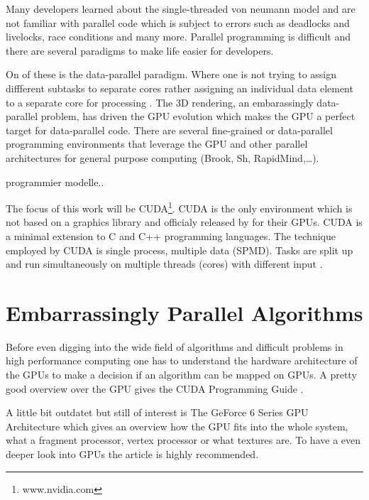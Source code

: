 Many developers learned about the single-threaded von neumann model and are not
familiar with parallel code which is subject to errors such as deadlocks and
livelocks, race conditions and many more. Parallel programming is difficult and
there are several paradigms to make life easier for developers.

On of these is the data-parallel paradigm. Where one is not trying to assign
diffferent subtasks to separate cores rather assigning an individual data
element to a separate core for processing \citep{citeulike:3750565}. The
\gls{3D} rendering, an embarassingly data-parallel problem, has driven the
\gls{GPU} evolution which makes the \gls{GPU} a perfect target for data-parallel
code. There are several fine-grained or data-parallel programming environments
that leverage the \gls{GPU} and other parallel architectures for general purpose
computing (Brook, Sh, RapidMind,\ldots).

{\color{red} programmier modelle..}

The focus of this work will be CUDA\footnote{www.nvidia.com}. \gls{CUDA} is the
only environment which is not based on a graphics library and officialy released
by {} for their \glspl{GPU}. \Gls{CUDA} is a minimal
extension to C and C++ programming languages. The technique employed by
\gls{CUDA} is single process, multiple data (SPMD). Tasks are split up and run
simultaneously on multiple threads (cores) with different input
\citep{citeulike:3072519}.

\section{Embarrassingly Parallel Algorithms} %
\label{ssub:choosing_a_fast_algorithm}
Before even digging into the wide field of algorithms and difficult problems in
high performance computing one has to understand the hardware architecture of
the \glspl{GPU} to make a decision if an algorithm can be mapped on \glspl{GPU}.
A pretty good overview over the {} \gls{GPU} gives the 
 \gls{CUDA} Programming Guide \citep{citeulike:3325943}. 

A little bit outdatet but still of interest is The GeForce 6 Series
\gls{GPU} Architecture \citep{citeulike:3757915} which gives an overview how the
\gls{GPU} fits into the whole system, what a fragment processor, vertex
processor or what textures are. To have a even deeper look into \glspl{GPU} the
article \citep{citeulike:2790995} is highly recommended.

